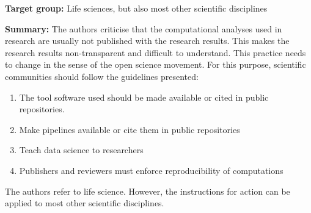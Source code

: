 \documentclass{article}
\begin{document}
\textbf{Target group:} Life sciences, but also most other scientific disciplines


\textbf{Summary: }The authors criticise that the computational analyses used in research are usually not published with the research results. This makes the research results non-transparent and difficult to understand. This practice needs to change in the sense of the open science movement. For this purpose, scientific communities should follow the guidelines presented:

\begin{enumerate}
\item The tool software used should be made available or cited in public repositories.


\item Make pipelines available or cite them in public repositories


\item Teach data science to researchers


\item Publishers and reviewers must enforce reproducibility of computations


\end{enumerate}

The authors refer to life science. However, the instructions for action can be applied to most other scientific disciplines.


\printbibliography[title={Bibliography}]
\end{document}
